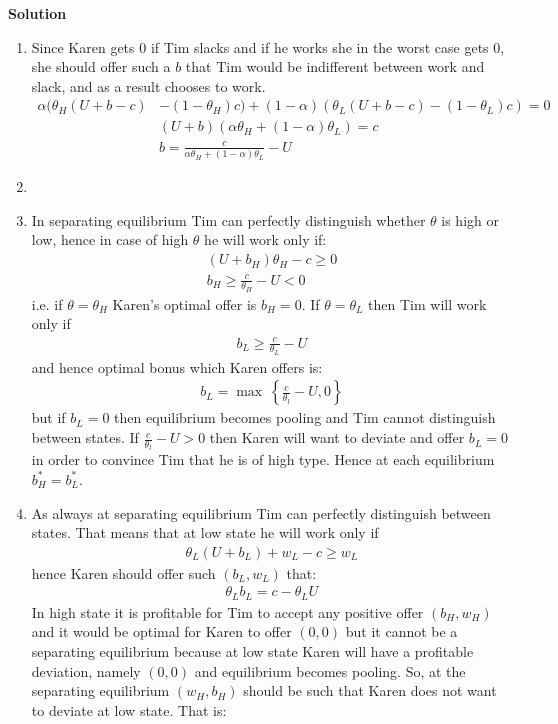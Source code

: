 \documentclass[a4paper]{article}
\begin{document}
\textbf{Solution}

\begin{enumerate}
	\item Since Karen gets 0 if Tim slacks and if he works she in the worst case gets 0, she should offer such a $b$ that Tim would be indifferent between work and slack, and as a result chooses to work.
	\begin{align*}
	\alpha(\theta_H(U + b - c) &- (1 - \theta_H)c) + (1 - \alpha)(\theta_L(U + b - c) - (1 - \theta_L)c) = 0\\
	&(U+b)(\alpha\theta_H + (1 - \alpha)\theta_L) = c\\
	&b = \frac{c}{\alpha\theta_H + (1 - \alpha)\theta_L} - U
	\end{align*}
	\item 
	\item In separating equilibrium Tim can perfectly distinguish whether $\theta$ is high or low, hence in case of high $\theta$ he will work only if:
	\begin{align*}
	(U + b_H)\theta_H - c \ge 0\\
	b_H \ge \frac{c}{\theta_H} - U < 0
	\end{align*}
	i.e. if $\theta = \theta_H$ Karen's optimal offer is $b_H = 0$. If $\theta = \theta_L$ then Tim will work only if
	\begin{align*}
	b_L \ge \frac{c}{\theta_L} - U
	\end{align*}
	and hence optimal bonus which Karen offers is:
	\begin{align*}
	b_L = \max\ \left\{\frac{c}{\theta_l} - U, 0\right\}
	\end{align*}
	but if $b_L = 0$ then equilibrium becomes pooling and Tim cannot distinguish between states. If $\frac{c}{\theta_l} - U > 0$ then Karen will want to deviate and offer $b_L = 0$ in order to convince Tim that he is of high type. Hence at each equilibrium $b^*_H = b^*_L$.
	\item  As always at separating equilibrium Tim can perfectly distinguish between states. That means that at low state he will work only if
	\begin{align*}
	\theta_L(U + b_L) + w_L - c \ge w_L
	\end{align*}
	hence Karen should offer such $(b_L, w_L)$ that:
	\begin{align*}
	\theta_L b_L = c - \theta_LU
	\end{align*}
	In high state it is profitable for Tim to accept any positive offer $(b_H, w_H)$ and it would be optimal for Karen to offer $(0, 0)$ but it cannot be a separating equilibrium because at low state Karen will have a profitable deviation, namely $(0, 0)$ and equilibrium becomes pooling. So, at the separating equilibrium $(w_H, b_H)$ should be such that Karen does not want to deviate at low state. That is:

\end{enumerate}
\end{document}
